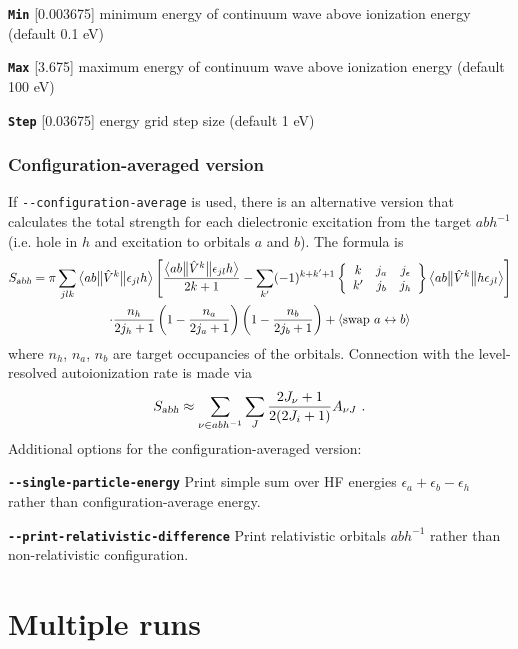 \documentclass[a4paper,11pt]{article}
\newcommand{\option}[1]{\smallskip\noindent\textbf{\texttt{#1}}}
\begin{document}
{\option{Min} [0.003675] minimum energy of continuum wave above ionization energy (default 0.1 eV)

\option{Max} [3.675] maximum energy of continuum wave above ionization energy (default 100 eV)

\option{Step} [0.03675] energy grid step size (default 1 eV)

\subsubsection{Configuration-averaged version}
If \texttt{-{}-configuration-average} is used, there is an alternative version that calculates the total strength for each dielectronic excitation from the target $a b h^{-1}$ (i.e. hole in $h$ and excitation to orbitals $a$ and $b$).
The formula is
\begin{multline}
\nonumber
S_\textsl{abh} = \pi \sum_{j l k} \big< a b \big\Vert \hat V^k \big\Vert \epsilon_{j l} h\big> 
	\left[ \frac{\big< a b \big\Vert \hat V^k \big\Vert \epsilon_{j l} h \big>}{2k+1}
	- \sum_{k'} (-1)^{k+k'+1} \left\{ \begin{array}{ccc} k & j_a & j_\epsilon \\ k' & j_b & j_h \end{array} \right\}
	\big< a b \big\Vert \hat V^k \big\Vert h \epsilon_{j l} \big> \right]\\
	\cdot \frac{n_h}{2 j_h + 1} \left(1 - \frac{n_a}{2 j_a + 1} \right) \left(1 - \frac{n_b}{2 j_b + 1} \right)
	+ \left< \textrm{swap}\ a \leftrightarrow b \right>
\end{multline}
where $n_h$, $n_a$, $n_b$ are target occupancies of the orbitals.
Connection with the level-resolved autoionization rate is made via
\[
S_\textsl{abh} \approx \sum_{\nu \in abh^{-1}} \sum_J \frac{2J_\nu + 1}{2 (2J_i + 1)} A_{\nu J} \ .
\]
Additional options for the configuration-averaged version:

\option{-{}-single-particle-energy} Print simple sum over HF energies $\epsilon_a + \epsilon_b - \epsilon_h$ rather than configuration-average energy.

\option{-{}-print-relativistic-difference} Print relativistic orbitals $a b h^{-1}$ rather than non-relativistic configuration.

\section{Multiple runs}

}
\end{document}
